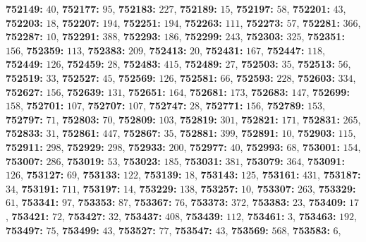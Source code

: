 \textsf{\bfseries 752149:} $40$, \textsf{\bfseries 752177:} $95$, \textsf{\bfseries 752183:} $227$, \textsf{\bfseries 752189:} $15$, \textsf{\bfseries 752197:} $58$, \textsf{\bfseries 752201:} $43$, \textsf{\bfseries 752203:} $18$, \textsf{\bfseries 752207:} $194$, \textsf{\bfseries 752251:} $194$, \textsf{\bfseries 752263:} $111$, \textsf{\bfseries 752273:} $57$, \textsf{\bfseries 752281:} $366$, \textsf{\bfseries 752287:} $10$, \textsf{\bfseries 752291:} $388$, \textsf{\bfseries 752293:} $186$, \textsf{\bfseries 752299:} $243$, \textsf{\bfseries 752303:} $325$, \textsf{\bfseries 752351:} $156$, \textsf{\bfseries 752359:} $113$, \textsf{\bfseries 752383:} $209$, \textsf{\bfseries 752413:} $20$, \textsf{\bfseries 752431:} $167$, \textsf{\bfseries 752447:} $118$, \textsf{\bfseries 752449:} $126$, \textsf{\bfseries 752459:} $28$, \textsf{\bfseries 752483:} $415$, \textsf{\bfseries 752489:} $27$, \textsf{\bfseries 752503:} $35$, \textsf{\bfseries 752513:} $56$, \textsf{\bfseries 752519:} $33$, \textsf{\bfseries 752527:} $45$, \textsf{\bfseries 752569:} $126$, \textsf{\bfseries 752581:} $66$, \textsf{\bfseries 752593:} $228$, \textsf{\bfseries 752603:} $334$, \textsf{\bfseries 752627:} $156$, \textsf{\bfseries 752639:} $131$, \textsf{\bfseries 752651:} $164$, \textsf{\bfseries 752681:} $173$, \textsf{\bfseries 752683:} $147$, \textsf{\bfseries 752699:} $158$, \textsf{\bfseries 752701:} $107$, \textsf{\bfseries 752707:} $107$, \textsf{\bfseries 752747:} $28$, \textsf{\bfseries 752771:} $156$, \textsf{\bfseries 752789:} $153$, \textsf{\bfseries 752797:} $71$, \textsf{\bfseries 752803:} $70$, \textsf{\bfseries 752809:} $103$, \textsf{\bfseries 752819:} $301$, \textsf{\bfseries 752821:} $171$, \textsf{\bfseries 752831:} $265$, \textsf{\bfseries 752833:} $31$, \textsf{\bfseries 752861:} $447$, \textsf{\bfseries 752867:} $35$, \textsf{\bfseries 752881:} $399$, \textsf{\bfseries 752891:} $10$, \textsf{\bfseries 752903:} $115$, \textsf{\bfseries 752911:} $298$, \textsf{\bfseries 752929:} $298$, \textsf{\bfseries 752933:} $200$, \textsf{\bfseries 752977:} $40$, \textsf{\bfseries 752993:} $68$, \textsf{\bfseries 753001:} $154$, \textsf{\bfseries 753007:} $286$, \textsf{\bfseries 753019:} $53$, \textsf{\bfseries 753023:} $185$, \textsf{\bfseries 753031:} $381$, \textsf{\bfseries 753079:} $364$, \textsf{\bfseries 753091:} $126$, \textsf{\bfseries 753127:} $69$, \textsf{\bfseries 753133:} $122$, \textsf{\bfseries 753139:} $18$, \textsf{\bfseries 753143:} $125$, \textsf{\bfseries 753161:} $431$, \textsf{\bfseries 753187:} $34$, \textsf{\bfseries 753191:} $711$, \textsf{\bfseries 753197:} $14$, \textsf{\bfseries 753229:} $138$, \textsf{\bfseries 753257:} $10$, \textsf{\bfseries 753307:} $263$, \textsf{\bfseries 753329:} $61$, \textsf{\bfseries 753341:} $97$, \textsf{\bfseries 753353:} $87$, \textsf{\bfseries 753367:} $76$, \textsf{\bfseries 753373:} $372$, \textsf{\bfseries 753383:} $23$, \textsf{\bfseries 753409:} $17$, \textsf{\bfseries 753421:} $72$, \textsf{\bfseries 753427:} $32$, \textsf{\bfseries 753437:} $408$, \textsf{\bfseries 753439:} $112$, \textsf{\bfseries 753461:} $3$, \textsf{\bfseries 753463:} $192$, \textsf{\bfseries 753497:} $75$, \textsf{\bfseries 753499:} $43$, \textsf{\bfseries 753527:} $77$, \textsf{\bfseries 753547:} $43$, \textsf{\bfseries 753569:} $568$, \textsf{\bfseries 753583:} $6$, 
